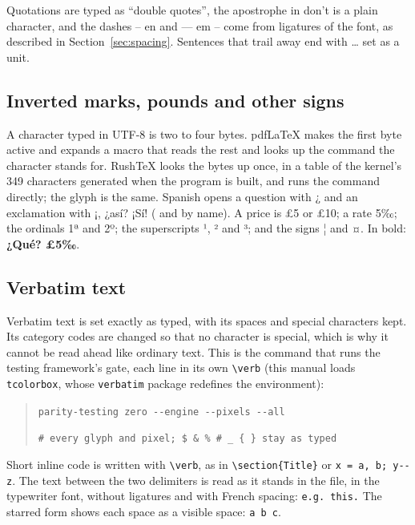 \documentclass{article}
\numberwithin{equation}{section}
\theoremstyle{definition}
\theoremstyle{remark}
\begin{document}
Quotations are typed as ``double quotes'', the apostrophe in don't is a plain
character, and the dashes -- en and --- em -- come from ligatures of the font, as
described in Section~\ref{sec:spacing}. Sentences that trail away end with \ldots{} set
as a unit.

\subsection{Inverted marks, pounds and other signs}\label{sec:licr}
A character typed in UTF-8 is two to four bytes. pdfLaTeX makes the first byte active and
expands a macro that reads the rest and looks up the command the character stands for.
RushTeX looks the bytes up once, in a table of the kernel's 349 characters generated when
the program is built, and runs the command directly; the glyph is the same.
Spanish opens a question with ¿ and an exclamation with ¡, ¿así? ¡Sí! (\textquestiondown{}
and \textexclamdown{} by name). A price is £5 or \pounds 10; a rate 5‰; the ordinals 1ª
and 2º; the superscripts ¹, ² and ³; and the signs ¦ and ¤. In bold: \textbf{¿Qué? £5‰}.

\subsection{Verbatim text}

Verbatim text is set exactly as typed, with its spaces and special characters kept. Its
category codes are changed so that no character is special, which is why it cannot be
read ahead like ordinary text. This is the command that runs the testing framework's
gate, each line in its own \verb|\verb| (this manual loads \texttt{tcolorbox}, whose
\texttt{verbatim} package redefines the environment):
\begin{quote}
\verb|parity-testing zero --engine --pixels --all|

\verb|# every glyph and pixel; $ & % # _ { } stay as typed|
\end{quote}

Short inline code is written with \verb|\verb|, as in \verb+\section{Title}+ or
\verb!x = a, b; y--z!. The text between the two delimiters is read as it stands in the
file, in the typewriter font, without ligatures and with French spacing: \verb|e.g. this.|
The starred form shows each space as a visible space: \verb*|a b c|.
\end{document}
